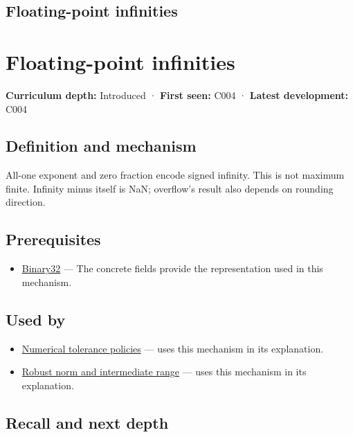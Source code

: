 \hypertarget{appendix-eb336149c00a}{}
\section*{Floating-point infinities}
\chapter{Floating-point infinities}\label{appendix-eb336149c00a-floating-point-infinities}

\textbf{Curriculum depth:} Introduced · \textbf{First seen:} C004 · \textbf{Latest development:} C004

\section{Definition and mechanism}\label{appendix-eb336149c00a-definition-and-mechanism}

All-one exponent and zero fraction encode signed infinity. This is not maximum finite. Infinity minus itself is NaN; overflow's result also depends on rounding direction.

\section{Prerequisites}\label{appendix-eb336149c00a-prerequisites}

\begin{itemize}
\tightlist
\item
  \hyperref[appendix-5057f9ad327f]{Binary32} --- The concrete fields provide the representation used in this mechanism.
\end{itemize}

\section{Used by}\label{appendix-eb336149c00a-used-by}

\begin{itemize}
\tightlist
\item
  \hyperref[appendix-0ec599f8ba27]{Numerical tolerance policies} --- uses this mechanism in its explanation.
\item
  \hyperref[appendix-7f1e17dcafb1]{Robust norm and intermediate range} --- uses this mechanism in its explanation.
\end{itemize}

\section{Recall and next depth}\label{appendix-eb336149c00a-recall-and-next-depth}

